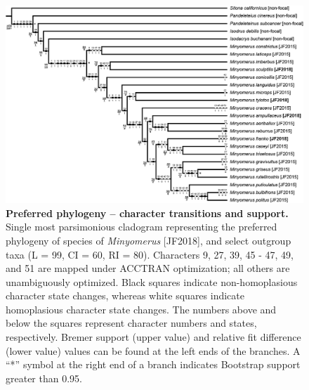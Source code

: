 \documentclass[fleqn,10pt,lineno]{wlpeerj} %
\begin{document}
\begin{figure}[h]
	\centering
	\begin{sideways}
		\includegraphics[height=0.85\textwidth]{figure37.png}
	\end{sideways}
	\caption{\textbf{Preferred phylogeny -- character transitions and support.} Single most parsimonious cladogram representing the preferred phylogeny of species of \textit{Minyomerus} [JF2018], and select outgroup taxa (L = 99, CI = 60, RI = 80). Characters 9, 27, 39, 45 - 47, 49, and 51 are mapped under ACCTRAN optimization; all others are unambiguously optimized. Black squares indicate non-homoplasious character state changes, whereas white squares indicate homoplasious character state changes. The numbers above and below the squares represent character numbers and states, respectively. Bremer support (upper value) and relative fit difference (lower value) values can be found at the left ends of the branches. A ``*'' symbol at the right end of a branch indicates Bootstrap support greater than 0.95.}
	\label{fig:tree1}
\end{figure}
\end{document}
